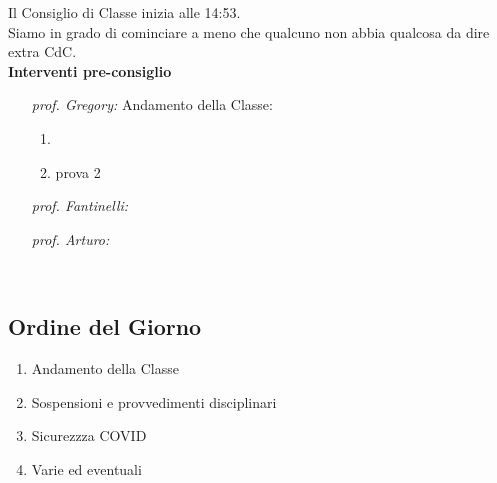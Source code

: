 \documentclass[11pt, a4paper]{exam}
\begin{document}
\newpage

Il Consiglio di Classe inizia alle 14:53.\\
Siamo in grado di cominciare a meno che qualcuno non abbia qualcosa da dire extra CdC.\\[20pt]
{\bf Interventi pre-consiglio}

\begin{enumerate}[label=\roman*]
	\item [\em prof. Gregory:]Andamento della Classe:
	\begin{enumerate}
		\item \lipsum[2]
		\item prova 2
	\end{enumerate}
	\item [\em prof. Fantinelli:]\lipsum[2]
	\item [\em prof. Arturo:]\lipsum[3]
\end{enumerate}

\vspace{12pt}
\par\noindent\dotfill{}\\[10pt]
\newpage
\subsection*{Ordine del Giorno}
\begin{enumerate}
	\item Andamento della Classe
	\item Sospensioni e provvedimenti disciplinari
	\item Sicurezzza COVID
	\item Varie ed eventuali
\end{enumerate}

\vspace{12pt}
\par\noindent\dotfill{}\\[10pt]
\end{document}
